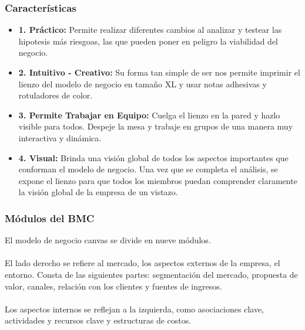 \documentclass[preprint,12pt]{elsarticle}
\begin{document}
	\subsubsection{\textbf{Características}}
	\begin{itemize}
	\item{\textbf{1. Práctico: }}Permite realizar diferentes cambios al analizar y testear las hipotesis más riesgoas, las que pueden poner en peligro la viabilidad del negocio.
	\item {\textbf{2. Intuitivo - Creativo: }}Su forma tan simple de ser nos permite imprimir el lienzo del modelo de negocio en tamaño XL y usar notas adhesivas y rotuladores de color.
	\item {\textbf{3. Permite Trabajar en Equipo: }}Cuelga el lienzo en la pared y hazlo visible para todos. Despeje la mesa y trabaje en grupos de una manera muy interactiva y dinámica.
	\item {\textbf{4. Visual: }}Brinda una visión global de todos los aspectos importantes que conforman el modelo de negocio. Una vez que se completa el análisis, se expone el lienzo para que todos los miembros puedan comprender claramente la visión global de la empresa de un vistazo.
	\end{itemize}

	\subsubsection{\textbf{Módulos del BMC}}
El modelo de negocio canvas se divide en nueve módulos. \\\\El lado derecho se refiere al mercado, los aspectos externos de la empresa, el entorno. Consta de las siguientes partes: segmentación del mercado, propuesta de valor, canales, relación con los clientes y fuentes de ingresos.\\\\ Los aspectos internos se reflejan a la izquierda, como asociaciones clave, actividades y recursos clave y estructuras de costos.
\end{document}
